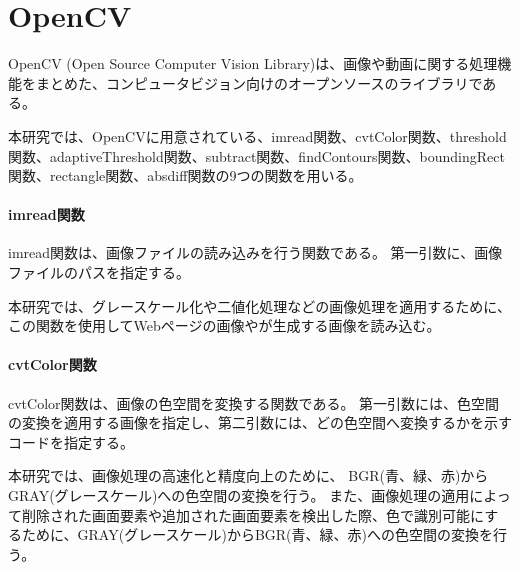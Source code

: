 \section{OpenCV}\label{sec:opencv}
OpenCV (Open Source Computer Vision Library)\cite{OpenCV}は、画像や動画に関する処理機能をまとめた、コンピュータビジョン向けのオープンソースのライブラリである。
\par
本研究では、OpenCVに用意されている、imread関数、cvtColor関数、threshold関数、adaptiveThreshold関数、subtract関数、findContours関数、boundingRect関数、rectangle関数、absdiff関数の9つの関数を用いる。

\paragraph{imread関数}
imread関数は、画像ファイルの読み込みを行う関数である。
第一引数に、画像ファイルのパスを指定する。
\par
本研究では、グレースケール化や二値化処理などの画像処理を適用するために、
この関数を使用してWebページの画像や\toolName が生成する画像を読み込む。
\paragraph{cvtColor関数}
cvtColor関数は、画像の色空間を変換する関数である。
第一引数には、色空間の変換を適用する画像を指定し、第二引数には、どの色空間へ変換するかを示すコード\cite{ColorCode}を指定する。
\par
本研究では、画像処理の高速化と精度向上のために、
BGR(青、緑、赤)からGRAY(グレースケール)への色空間の変換を行う。
また、画像処理の適用によって削除された画面要素や追加された画面要素を検出した際、色で識別可能にするために、GRAY(グレースケール)からBGR(青、緑、赤)への色空間の変換を行う。
